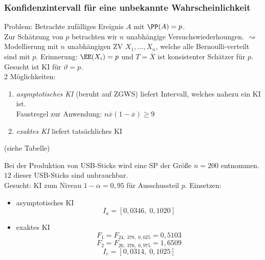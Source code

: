 \documentclass{scrreprt}
\begin{document}
\subsubsection{Konfidenzintervall für eine unbekannte Wahrscheinlichkeit}
Problem: Betrachte zufälliges Ereignis $A$ mit $\PP(A)=p$.\\
Zur Schätzung von $p$ betrachten wir $n$ unabhängige Versuchswiederhoungen. $\rightsquigarrow$ Modellierung mit $n$ unabhängigen ZV $X_1, \ldots, X_n$, welche alle Bernoulli-verteilt sind mit $p$. Erinnerung: $\EE(X_i)=p$ und $T=\overline{X}$ ist konsistenter Schätzer für $p$.\\
Gesucht ist KI für $\vartheta = p$.\\
2 Möglichkeiten:
\begin{enumerate}
\item \emph{asymptotisches KI} (beruht auf ZGWS) liefert Intervall, welches nahezu ein KI ist.\\
Faustregel zur Anwendung: $n \overline{x}(1-\overline{x})\geq 9$
\item \emph{exaktes KI} liefert tatsächliches KI
\end{enumerate}
(siehe Tabelle)

 Bei der Produktion von USB-Sticks wird eine SP der Größe $n=200$ entnommen. $12$ dieser USB-Sticks sind unbrauchbar.\\
Gesucht: KI zum Niveau $1-\alpha = 0,95$ für Ausschussteil $p$.
Einsetzen: 
\begin{itemize}
\item asymptotisches KI
$$I_a=[0,0346, \; 0,1020]$$
\item exaktes KI
$$F_1=F_{24,\; 378,\; 0,025}=0,5103$$
$$F_2=F_{26,\; 376, \; 0,975}=1,6509$$
$$I_e=[0,0314, \; 0,1025]$$
\end{itemize}
\end{document}
